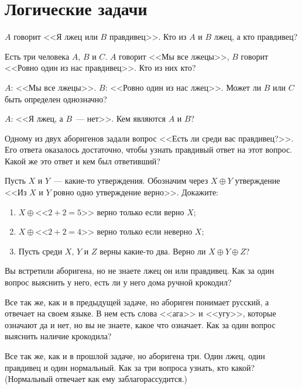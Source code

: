

\section*{Логические задачи}


\begin{problems}


\item
$A$ говорит <<Я лжец или $B$ правдивец>>.
Кто из $A$ и $B$ лжец, а кто правдивец?

\item
Есть три человека $A$, $B$ и $C$.
$A$ говорит <<Мы все лжецы>>, $B$ говорит <<Ровно один из нас правдивец>>.
Кто из них кто?

\item
$A$: <<Мы все лжецы>>.
$B$: <<Ровно один из нас лжец>>.
Может ли $B$ или $C$ быть определен однозначно?

\item
$A$: <<Я лжец, а $B$~--- нет>>.
Кем являются $A$ и $B$?

\item
Одному из двух аборигенов задали вопрос <<Есть ли среди вас правдивец?>>.
Его ответа оказалось достаточно, чтобы узнать правдивый ответ на этот вопрос.
Какой же это ответ и кем был ответивший?

\item
Пусть $X$ и $Y$~--- какие-то утверждения.
Обозначим через $X \oplus Y$ утверждение <<Из $X$ и $Y$ ровно одно утверждение верно>>.
Докажите:
\begin{enumerate}
\item $X \oplus \text{<<$2 + 2 = 5$>>}$ верно только если верно $X$;
\item $X \oplus \text{<<$2 + 2 = 4$>>}$ верно только если неверно $X$;
\item Пусть среди $X$, $Y$ и $Z$ верны какие-то два. Верно ли $X \oplus Y \oplus Z$?
\end{enumerate}

\item
Вы встретили аборигена, но не знаете лжец он или правдивец.
Как за один вопрос выяснить у него, есть ли у него дома ручной крокодил?

\item
Все так же, как и в предыдущей задаче, но абориген понимает русский, а отвечает на
своем языке.
В нем есть слова <<ага>> и <<угу>>, которые означают да и нет, но вы не знаете, какое
что означает.
Как за один вопрос выяснить наличие крокодила?

\item
Все так же, как и в прошлой задаче, но аборигена три.
Один лжец, один правдивец и один нормальный.
Как за три вопроса узнать, кто какой?
(Нормальный отвечает как ему заблагорассудится.)

\end{problems}

